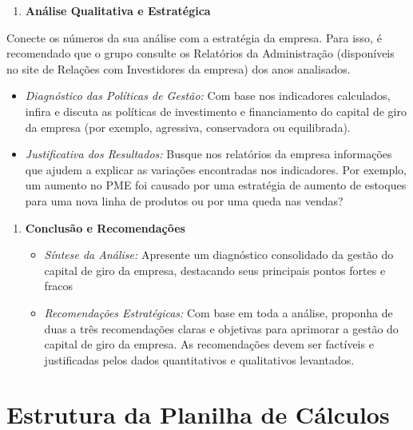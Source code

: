 \documentclass[
  a4paper,
]{book}
\providecommand{\tightlist}{%
  \setlength{\itemsep}{0pt}\setlength{\parskip}{0pt}}\usepackage{longtable,booktabs,array}
\begin{document}
\begin{enumerate}
\def\labelenumi{\arabic{enumi}.}
\setcounter{enumi}{2}
\tightlist
\item
  \textbf{Análise Qualitativa e Estratégica}
\end{enumerate}

Conecte os números da sua análise com a estratégia da empresa. Para
isso, é recomendado que o grupo consulte os Relatórios da Administração
(disponíveis no site de Relações com Investidores da empresa) dos anos
analisados.

\begin{itemize}
\tightlist
\item
  \emph{Diagnóstico das Políticas de Gestão:} Com base nos indicadores
  calculados, infira e discuta as políticas de investimento e
  financiamento do capital de giro da empresa (por exemplo, agressiva,
  conservadora ou equilibrada).\\
\item
  \emph{Justificativa dos Resultados:} Busque nos relatórios da empresa
  informações que ajudem a explicar as variações encontradas nos
  indicadores. Por exemplo, um aumento no PME foi causado por uma
  estratégia de aumento de estoques para uma nova linha de produtos ou
  por uma queda nas vendas?\\
\end{itemize}

\begin{enumerate}
\def\labelenumi{\arabic{enumi}.}
\setcounter{enumi}{3}
\item
  \textbf{Conclusão e Recomendações}

  \begin{itemize}
  \tightlist
  \item
    \emph{Síntese da Análise:} Apresente um diagnóstico consolidado da
    gestão do capital de giro da empresa, destacando seus principais
    pontos fortes e fracos\\
  \item
    \emph{Recomendações Estratégicas:} Com base em toda a análise,
    proponha de duas a três recomendações claras e objetivas para
    aprimorar a gestão do capital de giro da empresa. As recomendações
    devem ser factíveis e justificadas pelos dados quantitativos e
    qualitativos levantados.\\
  \end{itemize}
\end{enumerate}

\section{Estrutura da Planilha de Cálculos
📑}\label{estrutura-da-planilha-de-cuxe1lculos}
\end{document}
